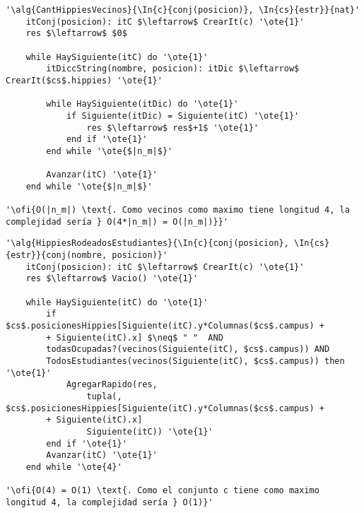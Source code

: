 \begin{lstlisting}[mathescape]
'\alg{CantHippiesVecinos}{\In{c}{conj(posicion)}, \In{cs}{estr}}{nat}'
	itConj(posicion): itC $\leftarrow$ CrearIt(c) '\ote{1}'
	res $\leftarrow$ $0$
	
	while HaySiguiente(itC) do '\ote{1}'
		itDiccString(nombre, posicion): itDic $\leftarrow$ CrearIt($cs$.hippies) '\ote{1}'
		
		while HaySiguiente(itDic) do '\ote{1}'
			if Siguiente(itDic) = Siguiente(itC) '\ote{1}'
				res $\leftarrow$ res$+1$ '\ote{1}'
			end if '\ote{1}'
		end while '\ote{$|n_m|$}'

		Avanzar(itC) '\ote{1}'
	end while '\ote{$|n_m|$}'

'\ofi{O(|n_m|) \text{. Como vecinos como maximo tiene longitud 4, la complejidad sería } O(4*|n_m|) = O(|n_m|)}}'
\end{lstlisting}

\begin{lstlisting}[mathescape]
'\alg{HippiesRodeadosEstudiantes}{\In{c}{conj(posicion}, \In{cs}{estr}}{conj(nombre, posicion)}'
	itConj(posicion): itC $\leftarrow$ CrearIt(c) '\ote{1}'
	res $\leftarrow$ Vacio() '\ote{1}'

	while HaySiguiente(itC) do '\ote{1}'
		if $cs$.posicionesHippies[Siguiente(itC).y*Columnas($cs$.campus) +
		+ Siguiente(itC).x] $\neq$ " "  AND 
		todasOcupadas?(vecinos(Siguiente(itC), $cs$.campus)) AND 
		TodosEstudiantes(vecinos(Siguiente(itC), $cs$.campus)) then '\ote{1}'
			AgregarRapido(res, 
				tupla(, $cs$.posicionesHippies[Siguiente(itC).y*Columnas($cs$.campus) +
		+ Siguiente(itC).x] 
				Siguiente(itC)) '\ote{1}'
		end if '\ote{1}'
		Avanzar(itC) '\ote{1}'
	end while '\ote{4}'

'\ofi{O(4) = O(1) \text{. Como el conjunto c tiene como maximo longitud 4, la complejidad sería } O(1)}'
\end{lstlisting}

